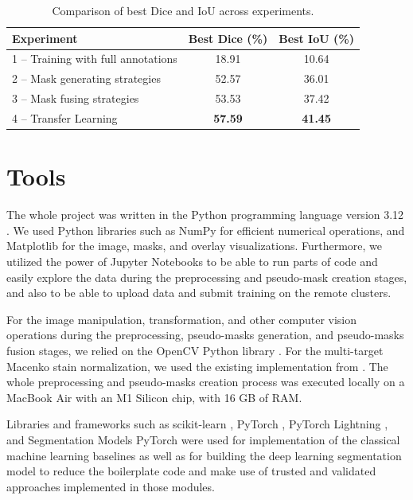\begin{table}[H]
  \centering
  \begin{tabular}{ l | c | c } 
    \hline
    \textbf{Experiment}                                  & \textbf{Best Dice (\%)} & \textbf{Best IoU (\%)} \\
    \hline
    1 – Training with full annotations                   & 18.91                   & 10.64                  \\
    2 – Mask generating strategies                       & 52.57                   & 36.01                  \\
    3 – Mask fusing strategies                           & 53.53                   & 37.42                  \\
    4 – Transfer Learning                                & \textbf{57.59}          & \textbf{41.45}          \\
    \hline
  \end{tabular}
  \caption{Comparison of best Dice and IoU across experiments.}
  \label{tab:summary-experiments}
\end{table}


\section{Tools}
The whole project was written in the Python programming language version 3.12  \cite{python}. We used Python libraries such as NumPy \cite{numpy} for efficient numerical operations, and Matplotlib \cite{matplotlib} for the image, masks, and overlay visualizations. Furthermore, we utilized the power of Jupyter Notebooks \cite{jupyter} to be able to run parts of code and easily explore the data during the preprocessing and pseudo-mask creation stages, and also to be able to upload data and submit training on the remote clusters.

For the image manipulation, transformation, and other computer vision operations during the preprocessing, pseudo-masks generation, and pseudo-masks fusion stages, we relied on the OpenCV Python library \cite{open-cv}. For the multi-target Macenko stain normalization, we used the existing implementation from \cite{torchstain}. The whole preprocessing and pseudo-masks creation process was executed locally on a MacBook Air with an M1 Silicon chip, with 16 GB of RAM.

Libraries and frameworks such as scikit-learn \cite{scikit-learn}, PyTorch \cite{pytorch}, PyTorch Lightning \cite{pytorch-ligthning}, and Segmentation Models PyTorch \cite{smp} were used for implementation of the classical machine learning baselines as well as for building the deep learning segmentation model to reduce the boilerplate code and make use of trusted and validated approaches implemented in those modules.

